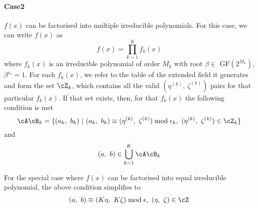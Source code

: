 

\paragraph{Case2}$f(x)$ can be factorised into multiple irreducible polynomials. \newline
For this case, we can write $f(x)$ as $$f(x)=\prod_{k=1}^{K}f_k(x)$$ where $f_k(x)$ is an irreducible polynomial of order $M_k$ with root $\beta \in $ GF$(2^{M_k})$, $\beta^{\epsilon_k}=1$. 
For each $f_k(x)$, we refer to the table of the extended field it generates and form the set $\cZ_k$, which contains all the valid $(\eta^{(k)},~\zeta^{(k)})$ pairs for that particular $f_k(x)$. If that set exists, then, for that $f_k(x)$ the following condition is met
\begin{equation}
\cA\cB_k=\{(a_k,~b_k)~|~(a_k,~b_k) \equiv (\eta^{(k)},~\zeta^{(k)}) \bmod \epsilon_k,~(\eta^{(k)},~\zeta^{(k)})\in \cZ_k\}
\end{equation}
and 
\begin{equation}
(a,~b) \in \bigcup_{k=1}^{K} \cA\cB_k
\end{equation}

For the special case where $f(x)$ can be factorised into equal irreducible polynomial, the above condition simplifies to 
 \begin{equation*}
 \begin{split}
 &(a,~b) \equiv (K\eta,~K\zeta) \bmod \epsilon,~(\eta,~\zeta) \in \cZ \\
 \end{split}
 \end{equation*}
 

